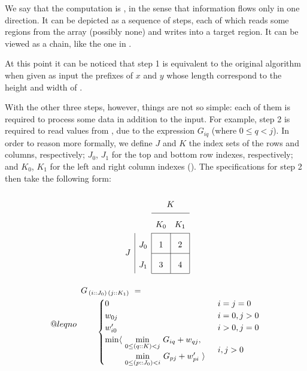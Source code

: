 We say that the computation is ,
in the sense that information flows only in one direction. It can be depicted as
a sequence of steps, each of which reads some regions from the array (possibly none)
and writes into a target region. It can be viewed as a chain, like the one in
.

\begin{figure}
\caption{\label{intro:chain}}
\end{figure}

At this point it can be noticed that step 1 is equivalent to the original
algorithm when given as input the prefixes of $x$ and $y$ whose length correspond to the
height and width of .

With the other three steps, however, things are not so simple:
each of them is required to process some data in addition to the input.
For example, step 2 is required to read values from , due to the expression
$G_{iq}$ (where $\scriptstyle 0\leq q<j$).
In order to reason more formally, we define $J$ and $K$ the index sets of the rows
and columns, respectively; $J_0$, $J_1$ for the top and bottom row indexes, respectively;
and $K_0$, $K_1$ for the left and right column indexes ().
The specifications for step 2 then take the following form:

\begin{figure}
\[
\renewcommand\arraystretch{2}
\begin{array}{c|c|c|c|}
  \multicolumn{2}{c}{} & \multicolumn{2}{c}{K} \\ \cline{3-4}
  \multicolumn{2}{c}{} & \multicolumn{1}{c}{K_0}  & \multicolumn{1}{c}{K_1}\\ \cline{3-4}
  \multirow{2}{*}{$J$} & J_0 & 1 & 2 \\ \cline{3-4}
    & J_1 & 3 & 4 \\ \cline{3-4}
\end{array}
\]
\caption{\label{intro:slice G}}
\end{figure}

\makeatletter
\newcommand{\LeftEqNo}{\let\veqno\@@leqno}
\makeatother

\begin{equation}\LeftEqNo
\renewcommand\arraystretch{1.5}
\begin{array}{l@{}l}
	G_{\,(i :: J_0)\,(j :: K_1)} ~=~  \\
	\qquad
	\begin{cases}
		0                        & i=j=0 \\
		w_{0j}                   & i=0, j>0 \\
		w'_{i0}                  & i>0, j=0 \\
		\begin{array}{@{}l@{~}l}
		  \min\langle & \underset{0\leq (q::K) <j}\min ~ G_{iq} + w_{qj}, \\
		              & \underset{0\leq (p::J_0) <i}\min ~ G_{pj} + w'_{pi}~\rangle
		\end{array}              & i,j>0
	\end{cases}
\end{array}
\end{equation}

